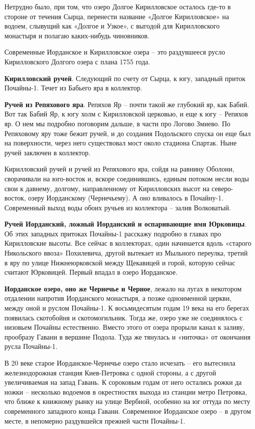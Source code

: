 Нетрудно было, при том, что озеро Долгое Кирилловское осталось где-то в стороне от течения Сырца, перенести название «Долгое Кирилловское» на водоем, слывущий как «Долгое и Узкое», с выгодой для Кирилловского монастыря и полагаю каких-нибудь чиновников.

Современные Иорданское и Кирилловское озера – это раздувшееся русло Кирилловского Долгого озера с плана 1755 года.

\textbf{Кирилловский ручей}. Следующий по счету от Сырца, к югу, западный приток Почайны-1. Течет из Бабьего яра в коллектор.

\textbf{Ручей из Репяхового яра}. Репяхов Яр – почти такой же глубокий яр, как Бабий. Вот так Бабий Яр, к югу холм с Кирилловской церковью, и еще к югу – Репяхов яр. О нем мы подробно поговорим дальше, в части про Логово Змиево. По Репяховому яру тоже бежит ручей, и до создания Подольского спуска он еще был на поверхности, через него существовал мост около стадиона Спартак. Ныне ручей заключен в коллектор.

Кирилловский ручей и ручей из Репяхового яра, сойдя на равнину Оболони, сворачивали на юго-восток и, вскоре соединившись, единым потоком несли воды свои к давнему, долгому, направленному от Кирилловских высот на северо-восток, озеру Иорданскому (Чернечьему). А оно вливалось в Почайну-1. Современный выход воды обоих ручьев из коллектора – залив Волковатый.
 
\textbf{Ручей Иорданский, ложный Иорданский и оспаривающие имя Юрковицы}. Об этих западных притоках Почайны-1 расскажу подробно в главах про Кирилловские высоты. Все сейчас в коллекторах, один начинается вдоль «старого Никольского ввоза» Похилевича, другой вытекает из Мыльного переулка, третий в яру по улице Нижнеюрковской между Щекавицей и горой, которую сейчас считают Юрковицей. Первый впадал в озеро Иорданское.

\textbf{Иорданское озеро, оно же Чернечье и Черное}, лежало на лугах в некотором отдалении напротив Иорданского монастыря, а позже одноименной церкви, между оной и руслом Почайны-1. К восьмидесятым годам 19 века на его берегах появилась скотобойня и скотомогильник. Тогда же, озеро уже не соединялось с низовьем Почайны естественно. Вместо этого от озера прорыли канал к заливу, прообразу Гавани в вершине Подола. Туда же тянулась и «ниточка» от окончания русла Почайны-1.

В 20 веке старое Иорданское-Чернечье озеро стало исчезать – его вытеснила железнодорожная станция Киев-Петровка с одной стороны, а с другой увеличиваемая на запад Гавань. К сороковым годам от него остались рожки да ножки – несколько водоемов в окрестностях выхода из станции метро Петровка, что ближе к книжному рынку на улице Вербной, особенно на юг оттуда по месту современного западного конца Гавани. Современное Иорданское озеро – в другом месте, в непомерно раздувшейся прежней части Почайны-1.

